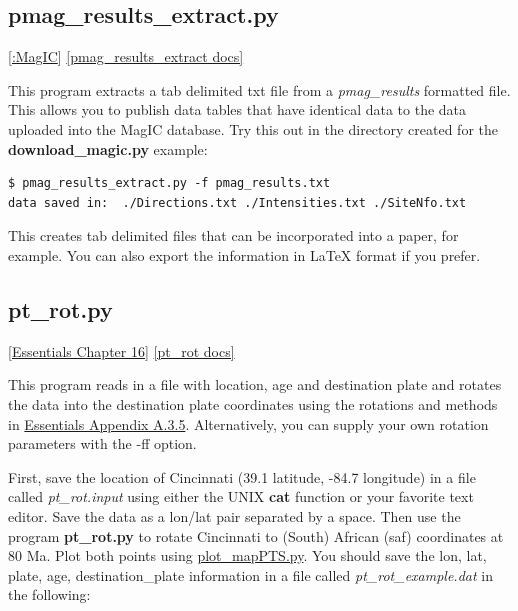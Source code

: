 \documentclass[11pt]{book}
\begin{document}
{{

\subsection{pmag\_results\_extract.py}
\href{#MagiC}{[:MagIC}]
\href{https://github.com/PmagPy/PmagPy/blob/master/programs/pmag_results_extract.py}{[pmag\_results\_extract docs]}

This program extracts a tab delimited txt file from a {\it pmag\_results} formatted file.   This allows you to publish data tables that have identical data to the data uploaded into the MagIC database.    Try this out in the directory created for the {\bf download\_magic.py} example:

\begin{verbatim}
$ pmag_results_extract.py -f pmag_results.txt
data saved in:  ./Directions.txt ./Intensities.txt ./SiteNfo.txt
\end{verbatim}

This creates tab delimited files that can be incorporated into a paper, for example.   You can also export the information in LaTeX format if you prefer.





\subsection{pt\_rot.py}
\href{http://earthref.org/MAGIC/books/Tauxe/Essentials/WebBook3ch16.html#ch16}{[Essentials Chapter 16]}
\href{https://github.com/PmagPy/PmagPy/blob/master/programs/pt_rot.py}{[pt\_rot docs]}

This program reads in a file with location, age and destination plate and rotates the data into the destination plate coordinates using the rotations and methods in \href{http://earthref.org/MAGIC/books/Tauxe/Essentials/WebBook3ap1.html#polerot}{Essentials Appendix A.3.5}.  Alternatively, you can supply your own rotation parameters with the -ff option.

First, save  the location of Cincinnati (39.1 latitude, -84.7 longitude) in a file called {\it pt\_rot.input} using either the UNIX {\bf cat} function or your favorite text editor.  Save the data as a lon/lat pair separated by a space.  Then use the program {\bf pt\_rot.py} to rotate Cincinnati to (South) African (saf) coordinates at 80 Ma.  Plot both points using \href{#plot_mapPTS.py}{plot\_mapPTS.py}.   You should save the lon, lat, plate, age, destination\_plate information in a file called {\it pt\_rot\_example.dat} in the following:

}}
\end{document}

